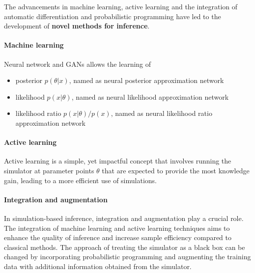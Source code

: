 The advancements in machine learning, active learning and the integration of automatic differentiation and probabilistic programming have led to the development of \textbf{novel methods for inference}.

\paragraph*{Machine learning}
Neural network and GANs allows the learning of 
\begin{itemize}
  \item posterior $p(\theta|x)$, named as neural posterior approximation network
  \item likelihood $p(x|\theta)$, named as neural likelihood approximation network
  \item likelihood ratio $p(x |\theta)/p(x)$, named as neural likelihood ratio approximation network
\end{itemize}


\paragraph*{Active learning}
Active learning is a simple, yet impactful concept that involves running the simulator at parameter points $\theta$ that are expected to provide the most knowledge gain, leading to a more efficient use of simulations.

\paragraph*{Integration and augmentation}
In simulation-based inference, integration and augmentation play a crucial role. The integration of machine learning and active learning techniques aims to enhance the quality of inference and increase sample efficiency compared to classical methods. The approach of treating the simulator as a black box can be changed by incorporating probabilistic programming and augmenting the training data with additional information obtained from the simulator.

